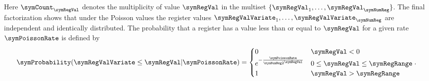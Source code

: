 \documentclass[a4paper]{scrartcl}
\begin{document}
Here $\symCount_\symRegVal$ denotes the multiplicity of value $\symRegVal$  in the multiset $\lbrace\symRegVal_1,\ldots,\symRegVal_\symNumReg\rbrace$.
The final factorization shows that under the Poisson values the register values $\symRegValVariate_1,\ldots,\symRegValVariate_\symNumReg$ are independent and identically distributed. The probability that a register has a value less than or equal to $\symRegVal$ for a given rate $\symPoissonRate$ is defined by
\begin{equation}
\label{equ:register_value_distribution}
\symProbability(\symRegValVariate \leq \symRegVal\vert\symPoissonRate)
=
\begin{cases}
0 & \symRegVal < 0 \\
e^{-\frac{\symPoissonRate}{\symNumReg 2^\symRegVal}} & 0\leq \symRegVal \leq \symRegRange \\
1 & \symRegVal > \symRegRange
\end{cases}.
\end{equation}
\end{document}
